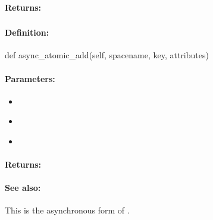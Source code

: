 \paragraph{Returns:}


\pagebreak
\subsubsection{}
\label{api:python:async_atomic_add}


\paragraph{Definition:}
\begin{pythoncode}
def async_atomic_add(self, spacename, key, attributes)
\end{pythoncode}

\paragraph{Parameters:}
\begin{itemize}[noitemsep]
\item {}\\

\item {}\\

\item {}\\

\end{itemize}

\paragraph{Returns:}


\paragraph{See also:}  This is the asynchronous form of .

\pagebreak
\subsubsection{}
\label{api:python:uxact_atomic_add}



